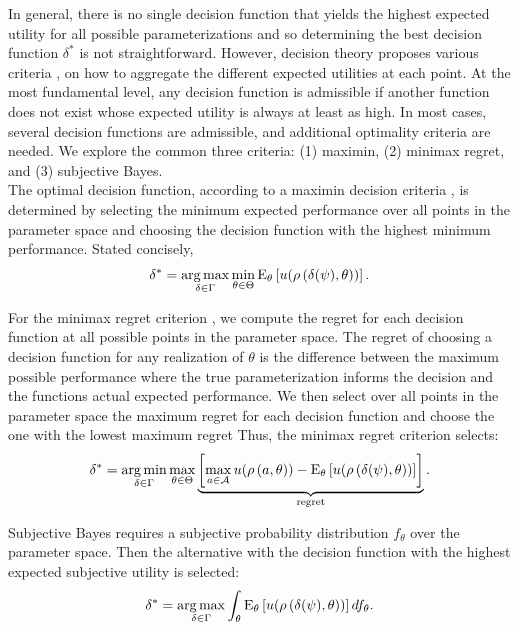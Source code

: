 In general, there is no single decision function that yields the highest expected utility for all possible parameterizations and so determining the best decision function  $\delta^*$ is not straightforward. However, decision theory proposes various criteria \citep{Gilboa.2009,Marinacci.2015}, on how to aggregate the different expected utilities at each point. At the most fundamental level, any decision function is admissible if another function does not exist whose expected utility is always at least as high. In most cases, several decision functions are admissible, and additional optimality criteria are needed. We explore the common three criteria: (1) maximin, (2) minimax regret, and (3) subjective Bayes.\\

The optimal decision function, according to a maximin decision criteria \citep{Gilboa.1989,Wald.1950}, is determined by selecting the minimum expected performance over all points in the parameter space and choosing the decision function with the highest minimum performance. Stated concisely,
%
\begin{align*}
\delta^*= \operatorname*{arg\,max}_{\delta \in \Gamma } \min_{\theta\in \Theta} \mathrm{E}_{\theta}\left[u(\rho\left(\delta(\psi), \theta\right))\right].
\end{align*}

For the minimax regret criterion \citep{Manski.2004,Niehans.1948}, we compute the regret for each decision function at all possible points in the parameter space. The regret of choosing a decision function for any realization of $\theta$ is the difference between the maximum possible performance where the true parameterization informs the decision and the functions actual expected performance. We then select over all points in the parameter space the maximum regret for each decision function and choose the one with the lowest maximum regret Thus, the minimax regret criterion selects:
%
\begin{align*}
\delta^* =  \operatorname*{arg\,min}_{\delta \in \Gamma } \max_{\theta\in \Theta}  \underbrace{\left[\max_{a \in \mathcal{A}}  u(\rho\left(a, \theta\right))  - \mathrm{E}_{\theta}\left[u(\rho\left(\delta(\psi), \theta\right)) \right]\right]}_{\text{regret}}.
\end{align*}

Subjective Bayes \citep{Savage.1954} requires a subjective probability distribution $f_{\theta}$ over the parameter space. Then the alternative with the decision function with the highest expected subjective utility is selected:
%
\begin{align*}
\delta^* = \operatorname*{arg\,max}_{\delta \in \Gamma }  \int_{\theta} \mathrm{E}_{\theta}\left[u(\rho\left(\delta(\psi), \theta\right))\right]df_{\theta}.
\end{align*}
